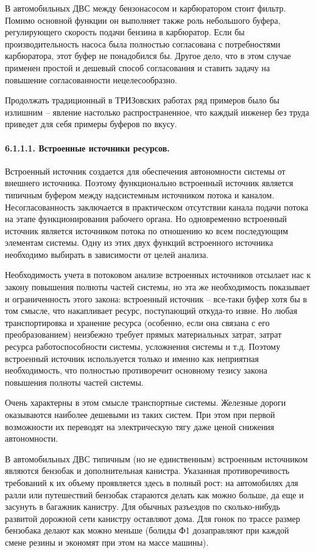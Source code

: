 \documentclass[a4paper,11pt]{article}
\begin{document}
В автомобильных ДВС между бензонасосом и карбюратором стоит фильтр. Помимо
основной функции он выполняет также роль небольшого буфера, регулирующего
скорость подачи бензина в карбюратор. Если бы производительность насоса была
полностью согласована с потребностями карбюратора, этот буфер не понадобился
бы. Другое дело, что в этом случае применен простой и дешевый способ
согласования и ставить задачу на повышение согласованности нецелесообразно.

Продолжать традиционный в ТРИЗовских работах ряд примеров было бы излишним --
явление настолько распространенное, что каждый инженер без труда приведет для
себя примеры буферов по вкусу.

\paragraph{6.1.1.1.  Встроенные источники ресурсов.}

Встроенный источник создается для обеспечения автономности системы от внешнего
источника. Поэтому функционально встроенный источник является типичным буфером
между надсистемным источником потока и каналом. Несогласованность заключается
в практическом отсутствии канала подачи потока на этапе функционирования
рабочего органа. Но одновременно встроенный источник является источником
потока по отношению ко всем последующим элементам системы. Одну из этих двух
функций встроенного источника необходимо выбирать в зависимости от целей
анализа.

Необходимость учета в потоковом анализе встроенных источников отсылает нас к
закону повышения полноты частей системы, но эта же необходимость показывает и
ограниченность этого закона: встроенный источник -- все-таки буфер хотя бы в
том смысле, что накапливает ресурс, поступающий откуда-то извне. Но любая
транспортировка и хранение ресурса (особенно, если она связана с его
преобразованием) неизбежно требует прямых материальных затрат, затрат ресурса
работоспособности системы, усложнения системы и т.д. Поэтому встроенный
источник используется только и именно как неприятная необходимость, что
полностью противоречит основному тезису закона повышения полноты частей
системы.

Очень характерны в этом смысле транспортные системы. Железные дороги
оказываются наиболее дешевыми из таких систем. При этом при первой возможности
их переводят на электрическую тягу даже ценой снижения автономности.

В автомобильных ДВС типичным (но не единственным) встроенным источником
являются бензобак и дополнительная канистра. Указанная противоречивость
требований к их объему проявляется здесь в полный рост: на автомобилях для
ралли или путешествий бензобак стараются делать как можно больше, да еще и
засунуть в багажник канистру. Для обычных разъездов по сколько-нибудь развитой
дорожной сети канистру оставляют дома. Для гонок по трассе размер бензобака
делают как можно меньше (болиды Ф1 дозаправляют при каждой смене резины и
экономят при этом на массе машины).
\end{document}
